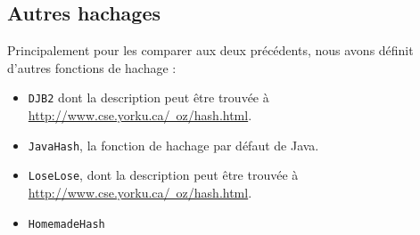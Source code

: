 \documentclass[12pt,a4paper,titlepage]{article}
\newcommand{\class}[1]{\texttt{#1}}
\begin{document}
\subsection{Autres hachages}
Principalement pour les comparer aux deux précédents, nous avons définit d'autres fonctions de hachage :
\begin{itemize}
\item \class{DJB2} dont la description peut être trouvée à \href{http://www.cse.yorku.ca/~oz/hash.html}{http://www.cse.yorku.ca/~oz/hash.html}.
\item \class{JavaHash}, la fonction de hachage par défaut de Java.
\item \class{LoseLose}, dont la description peut être trouvée à \href{http://www.cse.yorku.ca/~oz/hash.html}{http://www.cse.yorku.ca/~oz/hash.html}.
\item \class{HomemadeHash} %
\end{itemize}
\end{document}
